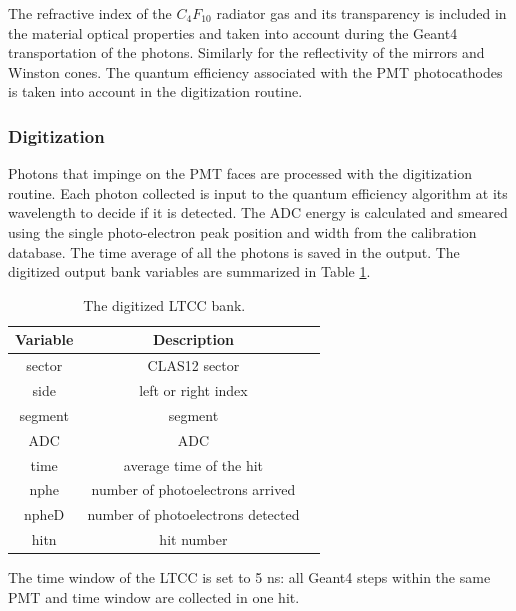 The refractive index of the $C_4F_{10}$ radiator gas and its transparency is included in the material optical properties and taken
into account during the Geant4 transportation of the photons.
Similarly for the reflectivity of the mirrors and Winston cones.
The quantum efficiency associated with the PMT photocathodes is taken into account in
the digitization routine.

\subsubsection{Digitization}

Photons that impinge on the PMT faces are processed with the digitization routine.
Each photon collected is input to the quantum efficiency algorithm at its wavelength to decide if it is detected.
The ADC energy is calculated and smeared using the single photo-electron peak position and width from the calibration database.
The time average of all the photons is saved in the output.
The digitized output bank variables are summarized in Table \ref{tab:ltccBank}.

\begin{table}[h]
	\begin{center}
		\begin{tabular}{| c | c | c |}
			\hline \hline
			Variable & Description                                         \\
			\hline
             sector  &                                     CLAS12 sector   \\
               side  &                               left or right index   \\
            segment  &                                           segment   \\
                ADC  &                                               ADC   \\
               time  &                           average time of the hit   \\
               nphe  &                  number of photoelectrons arrived   \\
              npheD  &                 number of photoelectrons detected   \\
               hitn  &                                        hit number   \\
			\hline \hline
		\end{tabular}
	\end{center}
	\caption{The digitized LTCC bank.}\label{tab:ltccBank}
\end{table}

The time window  of the LTCC is set to 5 ns: all Geant4 steps within the same PMT and time window are collected in one hit.
